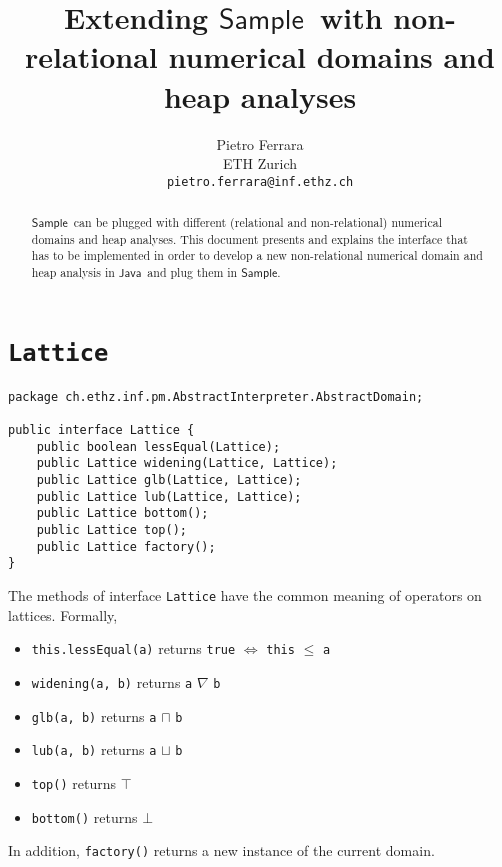 \documentclass[11pt]{article}
\newcommand{\ScalaAnalyzer}{\ensuremath{\mathsf{Sample}}}
\newcommand{\statement}[1]{\lstinline{#1}}
\newcommand{\Java}{\ensuremath{\mathsf{Java}}}
\begin{document}
\title{Extending \ScalaAnalyzer\ with non-relational numerical domains and heap analyses}

\author{
Pietro Ferrara\\
ETH Zurich\\
\texttt{pietro.ferrara@inf.ethz.ch}
}

\maketitle

\begin{abstract}
\ScalaAnalyzer\ can be plugged with different (relational and non-relational) numerical domains and heap analyses. This document presents and explains the interface that has to be implemented in order to develop a new non-relational numerical domain and heap analysis in \Java\ and plug them in \ScalaAnalyzer.
\end{abstract}


\section{\statement{Lattice}}

\begin{lstlisting}
package ch.ethz.inf.pm.AbstractInterpreter.AbstractDomain;

public interface Lattice {
    public boolean lessEqual(Lattice);
    public Lattice widening(Lattice, Lattice);
    public Lattice glb(Lattice, Lattice);
    public Lattice lub(Lattice, Lattice);
    public Lattice bottom();
    public Lattice top();
    public Lattice factory();
}
\end{lstlisting}

The methods of interface \statement{Lattice} have the common meaning of operators on lattices. Formally,
\begin{itemize}
\item \statement{this.lessEqual(a)} returns \statement{true} $\Leftrightarrow$ \statement{this} $\leq$ \statement{a}
\item \statement{widening(a, b)} returns \statement{a} $\nabla$ \statement{b}
\item \statement{glb(a, b)} returns \statement{a} $\sqcap$ \statement{b}
\item \statement{lub(a, b)} returns \statement{a} $\sqcup$ \statement{b}
\item \statement{top()} returns $\top$
\item \statement{bottom()} returns $\bot$
\end{itemize}
In addition, \statement{factory()} returns a new instance of the current domain.
\end{document}
